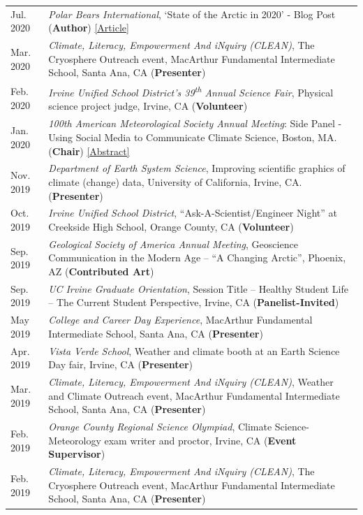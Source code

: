 \documentclass[margin,line,palatino,courier,10pt]{res}
\begin{document}
\begin{resume}
\begin{tabular}{@{}p{0.9in}p{4in}}
Jul. 2020 & \textit{Polar Bears International}, `State of the Arctic in 2020' - Blog Post (\textbf{Author}) \href{https://polarbearsinternational.org/news/article-climate-change/state-of-the-arctic-in-2020/}{[Article]}\\
Mar. 2020 &\textit{Climate, Literacy, Empowerment And iNquiry (CLEAN)}, The Cryosphere Outreach event, MacArthur Fundamental Intermediate School, Santa Ana, CA (\textbf{Presenter})\\
Feb. 2020 & \textit{Irvine Unified School District's 39\textsuperscript{th} Annual Science Fair}, Physical science project judge, Irvine, CA (\textbf{Volunteer})\\
Jan. 2020 & \textit{100th American Meteorological Society Annual Meeting}: Side Panel - Using Social Media to Communicate Climate Science, Boston, MA. (\textbf{Chair}) \href{https://ams.confex.com/ams/2020Annual/meetingapp.cgi/Session/53195}{[Abstract]}\\
Nov. 2019 & \textit{Department of Earth System Science}, Improving scientific graphics of climate (change) data, University of California, Irvine, CA. (\textbf{Presenter})\\
Oct. 2019 & \textit{Irvine Unified School District}, ``Ask-A-Scientist/Engineer Night'' at Creekside High School, Orange County, CA (\textbf{Volunteer})\\
Sep. 2019 & \textit{Geological Society of America Annual Meeting}, Geoscience Communication in the Modern Age -- ``A Changing Arctic'', Phoenix, AZ (\textbf{Contributed Art})\\
Sep. 2019 & \textit{UC Irvine Graduate Orientation}, Session Title -- Healthy Student Life -- The Current Student Perspective, Irvine, CA (\textbf{Panelist-Invited})\\
May 2019 & \textit{College and Career Day Experience}, MacArthur Fundamental Intermediate School, Santa Ana, CA (\textbf{Presenter})\\
Apr. 2019 & \textit{Vista Verde School}, Weather and climate booth at an Earth Science Day fair, Irvine, CA (\textbf{Presenter})\\
Mar. 2019 & \textit{Climate, Literacy, Empowerment And iNquiry (CLEAN)}, Weather and Climate Outreach event, MacArthur Fundamental Intermediate School, Santa Ana, CA (\textbf{Presenter})\\
Feb. 2019 & \textit{Orange County Regional Science Olympiad}, Climate Science-Meteorology exam writer and proctor, Irvine, CA (\textbf{Event Supervisor})\\
Feb. 2019 & \textit{Climate, Literacy, Empowerment And iNquiry (CLEAN)}, The Cryosphere Outreach event, MacArthur Fundamental Intermediate School, Santa Ana, CA (\textbf{Presenter})\\

\end{tabular}
\end{resume}
\end{document}
